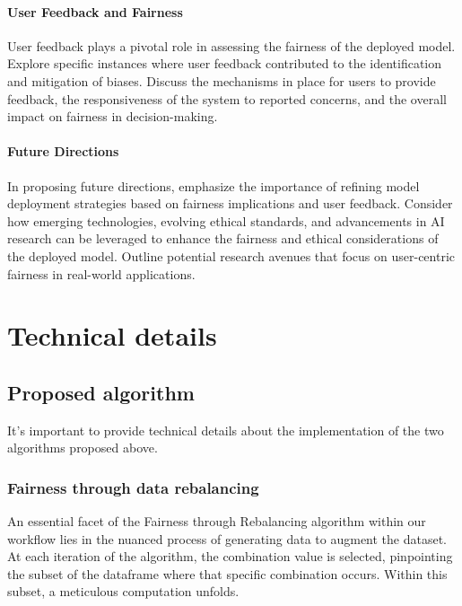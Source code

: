 \subsubsection{User Feedback and Fairness}

User feedback plays a pivotal role in assessing the fairness of the deployed model. Explore specific instances where user feedback contributed to the identification and mitigation of biases. Discuss the mechanisms in place for users to provide feedback, the responsiveness of the system to reported concerns, and the overall impact on fairness in decision-making.

\subsubsection{Future Directions}

In proposing future directions, emphasize the importance of refining model deployment strategies based on fairness implications and user feedback. Consider how emerging technologies, evolving ethical standards, and advancements in AI research can be leveraged to enhance the fairness and ethical considerations of the deployed model. Outline potential research avenues that focus on user-centric fairness in real-world applications.

\chapter{Technical details}
\label{chap:technicals}

\section{Proposed algorithm}

It's important to provide technical details about the implementation of the two algorithms proposed above.

\subsection{Fairness through data rebalancing}

An essential facet of the Fairness through Rebalancing algorithm within our workflow lies in the nuanced process of generating data to augment the dataset. At each iteration of the algorithm, the combination value is selected, pinpointing the subset of the dataframe where that specific combination occurs. Within this subset, a meticulous computation unfolds.

